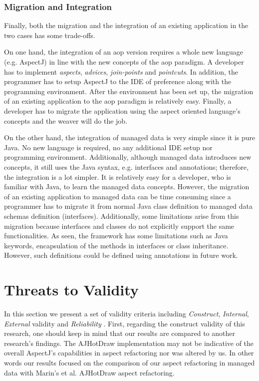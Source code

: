 \subsubsection{Migration and Integration}
Finally, both the migration and the integration of an existing application in the two cases has some trade-offs.

On one hand, the integration of an \ac{aop} version requires a whole new language (e.g. AspectJ) in line with the new concepts of the \ac{aop} paradigm.
A developer has to implement \textit{aspects}, \textit{advices}, \textit{join-points} and \textit{pointcuts}. 
In addition, the programmer has to setup AspectJ to the IDE of preference along with the programming environment.
After the environment has been set up, the migration of an existing application to the \ac{aop} paradigm is relatively easy.
Finally, a developer has to migrate the application using the aspect oriented language's concepts and the weaver will do the job.

On the other hand, the integration of managed data is very simple since it is pure Java.
No new language is required, no any additional IDE setup nor programming environment.
Additionally, although managed data introduces new concepts, it still uses the Java syntax, e.g. interfaces and annotations; therefore, the integration is a lot simpler.
It is relatively easy for a developer, who is familiar with Java, to learn the managed data concepts.
However, the migration of an existing application to managed data can be time consuming since a programmer has to migrate it from normal Java class definition  to managed data schemas definition (interfaces).
Additionally, some limitations arise from this migration because interfaces and classes do not explicitly support the same functionalities.
As seen, the framework has some limitations such as Java keywords, encapsulation of the methods in interfaces or class inheritance.
However, such definitions could be defined using annotations in future work.

\section{Threats to Validity}
In this section we present a set of validity criteria including \textit{Construct}, \textit{Internal}, \textit{External} validity and \textit{Reliability} \cite{easterbrook2008selecting}.
First, regarding the construct validity of this research, one should keep in mind that our results are compared to another research's findings. 
The AJHotDraw implementation may not be indicative of the overall AspectJ's capabilities in aspect refactoring nor was altered by us.
In other words our results focused on the comparison of our aspect refactoring in managed data with Marin's et al. AJHotDraw aspect refactoring.

